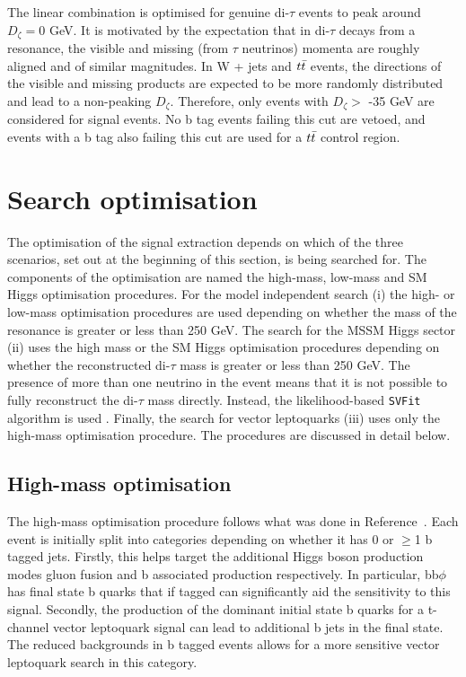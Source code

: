 The linear combination is optimised for genuine di-$\tau$ events to peak around $D_{\zeta} = 0$ GeV. 
It is motivated by the expectation that in di-$\tau$ decays from a resonance, the visible and missing (from $\tau$ neutrinos) momenta are roughly aligned and of similar magnitudes.
In W + jets and $t\bar{t}$ events, the directions of the visible and missing products are expected to be more randomly distributed and lead to a non-peaking $D_{\zeta}$.
Therefore, only events with $D_\zeta >$ -35 GeV are considered for signal events.
No b tag events failing this cut are vetoed, and events with a b tag also failing this cut are used for a $t\bar{t}$ control region.

\section{Search optimisation}
\label{sec:search_optimisation}

The optimisation of the signal extraction depends on which of the three scenarios, set out at the beginning of this section, is being searched for.
The components of the optimisation are named the high-mass, low-mass and \ac{SM} Higgs optimisation procedures.
For the model independent search (i) the high- or low-mass optimisation procedures are used depending on whether the mass of the resonance is greater or less than 250 GeV.
The search for the \ac{MSSM} Higgs sector (ii) uses the high mass or the \ac{SM} Higgs optimisation procedures depending on whether the reconstructed di-$\tau$ mass is greater or less than 250 GeV.
The presence of more than one neutrino in the event means that it is not possible to fully reconstruct the di-$\tau$ mass directly.
Instead, the likelihood-based \texttt{SVFit} algorithm is used \cite{Bianchini:2014vza}.
Finally, the search for vector leptoquarks (iii) uses only the high-mass optimisation procedure.
The procedures are discussed in detail below. \\

\subsection{High-mass optimisation}
\label{sec:high_mass_optimisation}

The high-mass optimisation procedure follows what was done in Reference~\cite{CMS_MSSM_Tau_2018}.
Each event is initially split into categories depending on whether it has 0 or $\geq$1 b tagged jets.
Firstly, this helps target the additional Higgs boson production modes gluon fusion and b associated production respectively.
In particular, bb$\phi$ has final state b quarks that if tagged can significantly aid the sensitivity to this signal.
Secondly, the production of the dominant initial state b quarks for a t-channel vector leptoquark signal can lead to additional b jets in the final state.
The reduced backgrounds in b tagged events allows for a more sensitive vector leptoquark search in this category. \\

